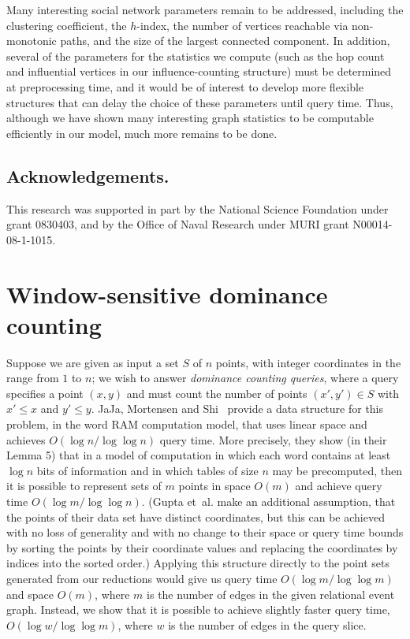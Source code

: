 \documentclass[11pt]{article}
\begin{document}
Many interesting social network parameters remain to be addressed, including the clustering coefficient, the $h$-index, the number of vertices reachable via non-monotonic paths, and the size of the largest connected component. In addition, several of the parameters for the statistics we compute (such as the hop count and  influential vertices in our influence-counting structure) must be determined at preprocessing time, and it would be of interest to develop more flexible structures that can delay the choice of these parameters until query time. Thus, although we have shown many interesting graph statistics to be computable efficiently in our model, much more remains to be done.

\newpage

\subsection*{Acknowledgements.}
This research was supported in part by the National Science Foundation under grant 0830403, and by the Office of Naval Research under MURI grant N00014-08-1-1015.

{\raggedright

}

\newpage
\appendix
\section{Window-sensitive dominance counting}

Suppose we are given as input a set $S$ of $n$ points, with integer coordinates in the range from $1$ to $n$; we wish to answer \emph{dominance counting queries}, where a query specifies a point $(x,y)$ and must count the number of points $(x',y')\in S$ with $x'\le x$ and $y'\le y$.
JaJa, Mortensen and Shi~\cite{JaJMorShi-ISAAC-04} provide a data structure for this problem, in the word RAM computation model, that uses linear space and achieves $O(\log n/\log\log n)$ query time. More precisely, they show (in their Lemma 5) that in a model of computation in which each word contains at least $\log n$ bits of information and in which tables of size $n$ may be precomputed,
then it is possible to represent sets of $m$ points in space $O(m)$ and achieve query time $O(\log m/\log\log n)$. (Gupta et~al.{} make an additional assumption, that the points of their data set have distinct coordinates, but this can be achieved with no loss of generality and with no change to their space or query time bounds by sorting the points by their coordinate values and replacing the coordinates by indices into the sorted order.)
Applying this structure directly to the point sets generated from our reductions would give us query time $O(\log m/\log\log m)$ and space $O(m)$, where $m$ is the number of edges in the given relational event graph. Instead, we show that it is possible to achieve slightly faster query time, $O(\log w/\log\log m)$, where $w$ is the number of edges in the query slice.
\end{document}
